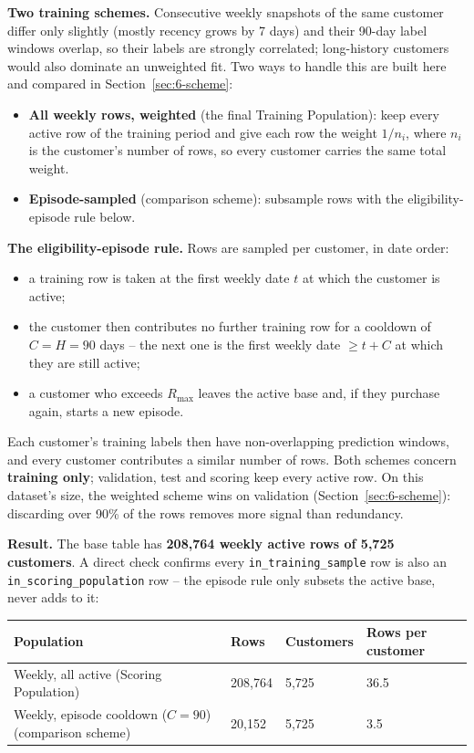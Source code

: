 \textbf{Two training schemes.} Consecutive weekly snapshots of the same customer differ only slightly (mostly recency grows by 7 days) and their 90-day label windows overlap, so their labels are strongly correlated; long-history customers would also dominate an unweighted fit. Two ways to handle this are built here and compared in Section~\ref{sec:6-scheme}:
\begin{itemize}
    \item \textbf{All weekly rows, weighted} (the final Training Population): keep every active row of the training period and give each row the weight $1/n_i$, where $n_i$ is the customer's number of rows, so every customer carries the same total weight.
    \item \textbf{Episode-sampled} (comparison scheme): subsample rows with the eligibility-episode rule below.
\end{itemize}

\textbf{The eligibility-episode rule.} Rows are sampled per customer, in date order:
\begin{itemize}
    \item a training row is taken at the first weekly date $t$ at which the customer is active;
    \item the customer then contributes no further training row for a cooldown of $C = H = 90$ days -- the next one is the first weekly date $\geq t + C$ at which they are still active;
    \item a customer who exceeds $R_{\max}$ leaves the active base and, if they purchase again, starts a new episode.
\end{itemize}
Each customer's training labels then have non-overlapping prediction windows, and every customer contributes a similar number of rows. Both schemes concern \textbf{training only}; validation, test and scoring keep every active row. On this dataset's size, the weighted scheme wins on validation (Section~\ref{sec:6-scheme}): discarding over 90\% of the rows removes more signal than redundancy.

\textbf{Result.} The base table has \textbf{208,764 weekly active rows of 5,725 customers}. A direct check confirms every \texttt{in\_training\_sample} row is also an \texttt{in\_scoring\_population} row -- the episode rule only subsets the active base, never adds to it:

\begin{center}
\begin{tabular}{@{}p{6.4cm}p{2.4cm}p{2.4cm}p{2.8cm}@{}}
    \toprule
    Population & Rows & Customers & Rows per customer \\
    \midrule
    Weekly, all active (Scoring Population) & 208,764 & 5,725 & 36.5 \\
    Weekly, episode cooldown ($C = 90$) (comparison scheme) & 20,152 & 5,725 & 3.5 \\
    \bottomrule
\end{tabular}
\end{center}

